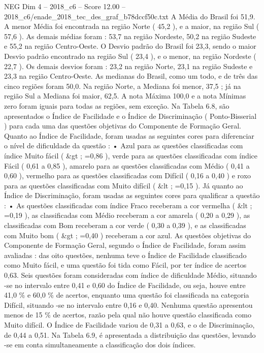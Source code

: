 \begin{textsample}{NEG Dim 4 – 2018\_c6 – Score 12.00 – 2018\_c6/enade\_2018\_tec\_des\_graf\_b78dccf50c.txt}
A Média do Brasil foi 51,9.
A menor Média foi encontrada na região Norte ( 45,2 ), e a maior, na região Sul ( 57,6 ).
As demais médias foram : 53,7 na região Nordeste, 50,2 na região Sudeste e 55,2 na região Centro-Oeste.
O Desvio padrão do Brasil foi 23,3, sendo o maior Desvio padrão encontrado na região Sul ( 23,4 ), e o menor, na região Nordeste ( 22,7 ).
Os demais desvios foram : 23,2 na região Norte, 23,1 na região Sudeste e 23,3 na região Centro-Oeste.
As medianas do Brasil, como um todo, e de três das cinco regiões foram 50,0.
Na região Norte, a Mediana foi menor, 37,5 ; já na região Sul a Mediana foi maior, 62,5.
A nota Máxima 100,0 e a nota Mínimas zero foram iguais para todas as regiões, sem exceção.
Na Tabela 6.8, são apresentados o Índice de Facilidade e o Índice de Discriminação ( Ponto-Bisserial ) para cada uma das questões objetivas do Componente de Formação Geral.
Quanto ao Índice de Facilidade, foram usadas as seguintes cores para diferenciar o nível de dificuldade da questão : • Azul para as questões classificadas com índice Muito fácil ( \&gt ; =0,86 ), verde para as questões classificadas com índice Fácil ( 0,61 a 0,85 ), amarelo para as questões classificadas com Médio ( 0,41 a 0,60 ), vermelho para as questões classificadas com Difícil ( 0,16 a 0,40 ) e roxo para as questões classificadas com Muito difícil ( \&lt ; =0,15 ).
Já quanto ao Índice de Discriminação, foram usadas as seguintes cores para qualificar a questão : • As questões classificadas com índice Fraco receberam a cor vermelha ( \&lt ; =0,19 ), as classificadas com Médio receberam a cor amarela ( 0,20 a 0,29 ), as classificadas com Bom receberam a cor verde ( 0,30 a 0,39 ), e as classificadas com Muito bom ( \&gt ; =0,40 ) receberam a cor azul.
As questões objetivas do Componente de Formação Geral, segundo o Índice de Facilidade, foram assim avaliadas : das oito questões, nenhuma teve o Índice de Facilidade classificado como Muito fácil, e uma questão foi tida como Fácil, por ter índice de acertos 0,63.
Seis questões foram consideradas com índice de dificuldade Médio, situando -se no intervalo entre 0,41 e 0,60 do Índice de Facilidade, ou seja, houve entre 41,0 \% e 60,0 \% de acertos, enquanto uma questão foi classificada na categoria Difícil, situando -se no intervalo entre 0,16 e 0,40.
Nenhuma questão apresentou menos de 15 \% de acertos, razão pela qual não houve questão classificada como Muito difícil.
O Índice de Facilidade variou de 0,31 a 0,63, e o de Discriminação, de 0,44 a 0,51.
Na Tabela 6.9, é apresentada a distribuição das questões, levando -se em conta simultaneamente a classificação dos dois índices.

\end{textsample}
